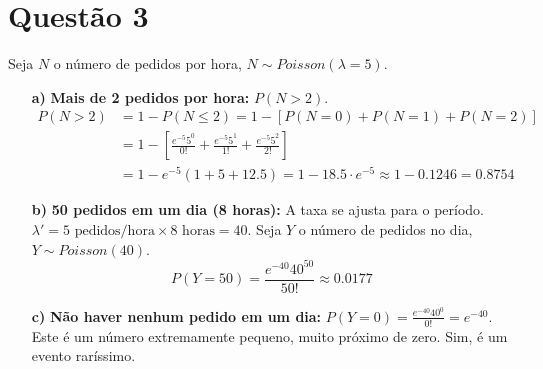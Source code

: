 \documentclass[12pt, a4paper]{article}
\begin{document}
\section*{Questão 3}
Seja $N$ o número de pedidos por hora, $N \sim Poisson(\lambda=5)$.
\begin{itemize}
    \item[\textbf{a)}] \textbf{Mais de 2 pedidos por hora:} $P(N > 2)$.
    \begin{align*}
    P(N > 2) &= 1 - P(N \le 2) = 1 - [P(N=0) + P(N=1) + P(N=2)] \\
    &= 1 - \left[ \frac{e^{-5}5^0}{0!} + \frac{e^{-5}5^1}{1!} + \frac{e^{-5}5^2}{2!} \right] \\
    &= 1 - e^{-5}(1 + 5 + 12.5) = 1 - 18.5 \cdot e^{-5} \approx 1 - 0.1246 = 0.8754
    \end{align*}
    \item[\textbf{b)}] \textbf{50 pedidos em um dia (8 horas):} A taxa se ajusta para o período. $\lambda' = 5 \text{ pedidos/hora} \times 8 \text{ horas} = 40$. Seja $Y$ o número de pedidos no dia, $Y \sim Poisson(40)$.
    $$ P(Y=50) = \frac{e^{-40}40^{50}}{50!} \approx 0.0177 $$
    \item[\textbf{c)}] \textbf{Não haver nenhum pedido em um dia:} $P(Y=0) = \frac{e^{-40}40^0}{0!} = e^{-40}$. Este é um número extremamente pequeno, muito próximo de zero. Sim, é um evento raríssimo.
\end{itemize}
\newpage
\end{document}
